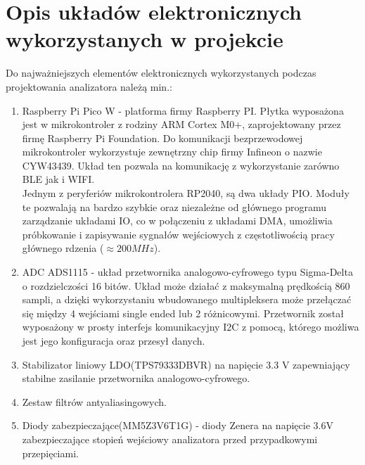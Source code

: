 \section{Opis układów elektronicznych wykorzystanych w projekcie}

Do najważniejszych elementów elektronicznych wykorzystanych 
podczas projektowania analizatora należą min.:
 
\begin{enumerate}
    \item Raspberry Pi Pico W - platforma firmy Raspberry PI.
        Płytka wyposażona jest w mikrokontroler z rodziny ARM Cortex M0+, zaprojektowany przez firmę Raspberry Pi Foundation.
        Do komunikacji bezprzewodowej mikrokontroler wykorzystuje zewnętrzny chip firmy Infineon o nazwie CYW43439.
        Układ ten pozwala na komunikację z wykorzystanie zarówno BLE jak i WIFI.\\
        Jednym z peryferiów mikrokontrolera RP2040, są dwa układy PIO.
        Moduły te pozwalają na bardzo szybkie oraz niezależne od głównego programu zarządzanie układami IO,
        co w połączeniu z układami DMA, umożliwia próbkowanie i zapisywanie sygnałów wejściowych z częstotliwością pracy głównego rdzenia ($\approx 200MHz$).
    \item ADC ADS1115 - 
        układ przetwornika analogowo-cyfrowego typu Sigma-Delta o rozdzielczości 16 bitów.
        Układ może działać z maksymalną prędkością 860 sampli,
        a dzięki wykorzystaniu wbudowanego multipleksera może przełączać się między 4 wejściami single ended lub 2 różnicowymi.
        Przetwornik został wyposażony w prosty interfejs komunikacyjny I2C z pomocą, którego możliwa jest jego konfiguracja oraz przesył danych.
    \item Stabilizator liniowy LDO(TPS79333DBVR) na napięcie 3.3 V zapewniający stabilne
    zasilanie przetwornika analogowo-cyfrowego.
    \item Zestaw filtrów antyaliasingowych.
    \item Diody zabezpieczające(MM5Z3V6T1G) - diody Zenera na napięcie 3.6V zabezpieczające stopień wejściowy analizatora
    przed przypadkowymi przepięciami.
\end{enumerate}

